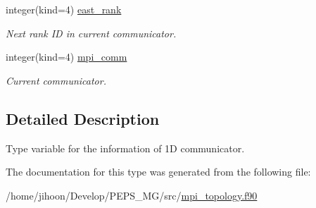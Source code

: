 \begin{DoxyCompactItemize}
integer(kind=4) \hyperlink{structmpi__topology_1_1cart__comm__1d_a7895ca5472496774a4ec59055dd310b1}{east\+\_\+rank}
\begin{DoxyCompactList}\small\item\em Next rank ID in current communicator. \end{DoxyCompactList}\item 
\mbox{\label{structmpi__topology_1_1cart__comm__1d_ae5e048f71450f5413a11c1d0f4c6a918}} 
integer(kind=4) \hyperlink{structmpi__topology_1_1cart__comm__1d_ae5e048f71450f5413a11c1d0f4c6a918}{mpi\+\_\+comm}
\begin{DoxyCompactList}\small\item\em Current communicator. \end{DoxyCompactList}\end{DoxyCompactItemize}


\subsection{Detailed Description}
Type variable for the information of 1D communicator. 

The documentation for this type was generated from the following file\+:\begin{DoxyCompactItemize}
\item 
/home/jihoon/\+Develop/\+P\+E\+P\+S\+\_\+\+M\+G/src/\hyperlink{mpi__topology_8f90}{mpi\+\_\+topology.\+f90}\end{DoxyCompactItemize}
